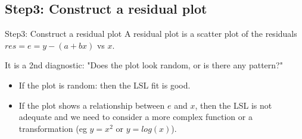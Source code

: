 \documentclass[t,xcolor=pdftex,dvipsnames,table]{beamer}
\makeatletter
\def\maxwidth{ %
  \ifdim\Gin@nat@width>\linewidth
    \linewidth
  \else
    \Gin@nat@width
  \fi
}
\newcommand{\hlstr}[1]{\textcolor[rgb]{0.192,0.494,0.8}{#1}}%
\newcommand{\hlopt}[1]{\textcolor[rgb]{0,0,0}{#1}}%
\newcommand{\hlstd}[1]{\textcolor[rgb]{0.345,0.345,0.345}{#1}}%
\newcommand{\hlkwc}[1]{\textcolor[rgb]{0.333,0.667,0.333}{#1}}%
\newcommand{\hlkwd}[1]{\textcolor[rgb]{0.737,0.353,0.396}{\textbf{#1}}}%
\newenvironment{kframe}{%
 \def\at@end@of@kframe{}%
 \ifinner\ifhmode%
  \def\at@end@of@kframe{\end{minipage}}%
  \begin{minipage}{\columnwidth}%
 \fi\fi%
 \def\FrameCommand##1{\hskip\@totalleftmargin \hskip-\fboxsep
 \colorbox{shadecolor}{##1}\hskip-\fboxsep
     \hskip-\linewidth \hskip-\@totalleftmargin \hskip\columnwidth}%
 \MakeFramed {\advance\hsize-\width
   \@totalleftmargin\z@ \linewidth\hsize
   \@setminipage}}%
 {\par\unskip\endMakeFramed%
 \at@end@of@kframe}
\newenvironment{knitrout}{}{} %
\makeatother
\begin{document}


\subsection[]{Step3: Construct a residual plot}
\begin{frame}[fragile]{Step3: Construct a residual plot}
A residual plot is a scatter plot of the residuals $res = e = y-(a+bx)$ vs $x$.

\vspace{.5cm}
It is a 2nd diagnostic: "Does the plot look random, or is there any pattern?"
\begin{itemize}
\item
  If the plot is random: then the LSL fit is good.
\item
	If the plot shows a relationship between $e$ and $x$, then the LSL is not adequate and we need to consider a more complex function or a transformation (eg $y=x^2$ or $y=log(x)$).
\end{itemize}
\end{frame} 
  
\end{document}
